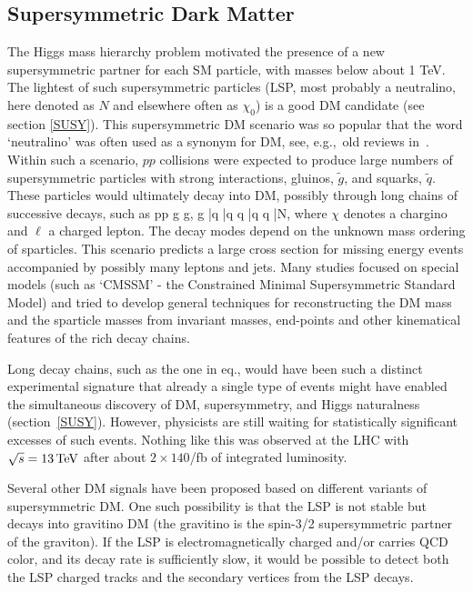\subsection{Supersymmetric Dark Matter}\label{sec:SUSYcolliderpheno}
The Higgs mass hierarchy problem motivated the presence of a new supersymmetric partner for each SM particle,
with masses below about 1 TeV.
The lightest of such supersymmetric particles (LSP, most probably a neutralino, here denoted as $N$ and elsewhere often as $\chi_0$) 
is a good DM candidate (see section \ref{SUSY}).
This supersymmetric DM scenario was so popular that the word `neutralino' was often used as a synonym for DM,
see, e.g.,\ old reviews in~\cite{otherpastDMreviews}.
Within such a scenario, $pp$ collisions were expected to produce large numbers of 
supersymmetric particles with strong interactions,
gluinos, $\tilde{g}$, and squarks, $\tilde{q}$.
These particles  would ultimately decay into DM, 
possibly through long chains of successive decays, such as
\beq\label{eq:SUSYdecaychains}
pp \to  \tilde g \tilde g,\qquad
 \tilde g \to \bar q \to \bar q q \chi \to \bar q q \ell \bar \nu N,
 \eeq
where $\chi$ denotes a chargino and $\ell$ a charged lepton.
The decay modes depend on the unknown mass ordering of sparticles.
This scenario predicts a large cross section for
missing energy events accompanied by possibly many leptons and jets.
Many studies focused on special models (such as `CMSSM' - the Constrained Minimal Supersymmetric Standard Model)
and tried to develop general techniques for reconstructing the DM mass and the sparticle masses from 
invariant masses, end-points and other kinematical features of the rich decay chains.

Long decay chains, such as the one in eq., would have been such a distinct experimental signature 
that already a single type of events might have enabled the simultaneous discovery of DM, supersymmetry, and Higgs naturalness
(section~\ref{SUSY}). However, physicists are still waiting for statistically significant excesses of such events.
Nothing like this was observed at the LHC with $\sqrt{s}=13\,{\rm TeV}$ after about $2\times140$/fb of integrated luminosity.


\bigskip

Several other DM signals
have been proposed based on different variants of supersymmetric DM. 
One such possibility is that the LSP is not stable but decays into gravitino DM
(the gravitino is the spin-3/2 supersymmetric partner of the graviton).
If the LSP is electromagnetically charged and/or carries QCD color, and its decay rate is sufficiently slow,
 it would be possible to detect both the LSP charged tracks and the secondary vertices from the LSP decays.

